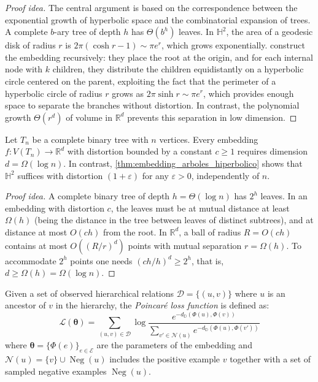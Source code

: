 \begin{proof}[Proof idea]
The central argument is based on the correspondence between the exponential growth of hyperbolic space and the combinatorial expansion of trees. A complete $b$-ary tree of depth $h$ has $\Theta(b^h)$ leaves. In $\mathbb{H}^2$, the area of a geodesic disk of radius $r$ is $2\pi(\cosh r - 1) \sim \pi e^r$, which grows exponentially. \citet{sarkar2011low} construct the embedding recursively: they place the root at the origin, and for each internal node with $k$ children, they distribute the children equidistantly on a hyperbolic circle centered on the parent, exploiting the fact that the perimeter of a hyperbolic circle of radius $r$ grows as $2\pi \sinh r \sim \pi e^r$, which provides enough space to separate the branches without distortion. In contrast, the polynomial growth $\Theta(r^d)$ of volume in $\mathbb{R}^d$ prevents this separation in low dimension.
\end{proof}

\begin{proposition}\label{prop:cota_inferior_euclidiano}
Let $T_n$ be a complete binary tree with $n$ vertices. Every embedding $f: V(T_n) \to \mathbb{R}^d$ with distortion bounded by a constant $c \geq 1$ requires dimension $d = \Omega(\log n)$. In contrast, \autoref{thm:embedding_arboles_hiperbolico} shows that $\mathbb{H}^2$ suffices with distortion $(1+\varepsilon)$ for any $\varepsilon > 0$, independently of $n$.
\end{proposition}

\begin{proof}[Proof idea]
A complete binary tree of depth $h = \Theta(\log n)$ has $2^h$ leaves. In an embedding with distortion $c$, the leaves must be at mutual distance at least $\Omega(h)$ (being the distance in the tree between leaves of distinct subtrees), and at distance at most $O(ch)$ from the root. In $\mathbb{R}^d$, a ball of radius $R = O(ch)$ contains at most $O((R/r)^d)$ points with mutual separation $r = \Omega(h)$. To accommodate $2^h$ points one needs $(ch/h)^d \geq 2^h$, that is, $d \geq \Omega(h) = \Omega(\log n)$.
\end{proof}

\begin{definition}\label{def:perdida_poincare}
Given a set of observed hierarchical relations $\mathcal{D} = \{(u, v)\}$ where $u$ is an ancestor of $v$ in the hierarchy, the \textit{Poincaré loss function} \citep{nickel2017poincare} is defined as:
\begin{equation}
    \mathcal{L}(\boldsymbol{\theta}) = \sum_{(u,v) \in \mathcal{D}} \log \frac{e^{-d_{\mathbb{D}}(\Phi(u), \Phi(v))}}{\displaystyle\sum_{v' \in \mathcal{N}(u)} e^{-d_{\mathbb{D}}(\Phi(u), \Phi(v'))}}
    \label{eq:perdida_poincare}
\end{equation}
where $\boldsymbol{\theta} = \{\Phi(e)\}_{e \in \mathcal{E}}$ are the parameters of the embedding and $\mathcal{N}(u) = \{v\} \cup \operatorname{Neg}(u)$ includes the positive example $v$ together with a set of sampled negative examples $\operatorname{Neg}(u)$.
\end{definition}

